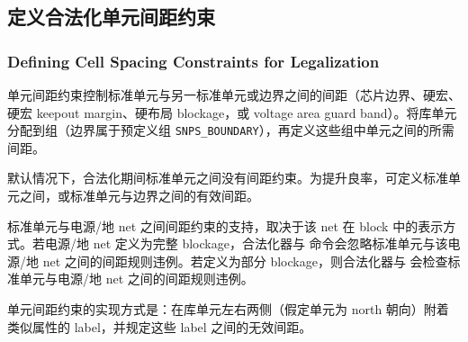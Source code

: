 \subsection{定义合法化单元间距约束}
\subsubsection*{Defining Cell Spacing Constraints for Legalization}

单元间距约束控制标准单元与另一标准单元或边界之间的间距（芯片边界、硬宏、硬宏 keepout margin、硬布局 blockage，或 voltage area guard band）。将库单元分配到组（边界属于预定义组 \texttt{SNPS\_BOUNDARY}），再定义这些组中单元之间的所需间距。

默认情况下，合法化期间标准单元之间没有间距约束。为提升良率，可定义标准单元之间，或标准单元与边界之间的有效间距。

\begin{noteBox}
标准单元与电源/地 net 之间间距约束的支持，取决于该 net 在 block 中的表示方式。若电源/地 net 定义为完整 blockage，合法化器与  命令会忽略标准单元与该电源/地 net 之间的间距规则违例。若定义为部分 blockage，则合法化器与  会检查标准单元与电源/地 net 之间的间距规则违例。
\end{noteBox}

单元间距约束的实现方式是：在库单元左右两侧（假定单元为 north 朝向）附着类似属性的 label，并规定这些 label 之间的无效间距。

